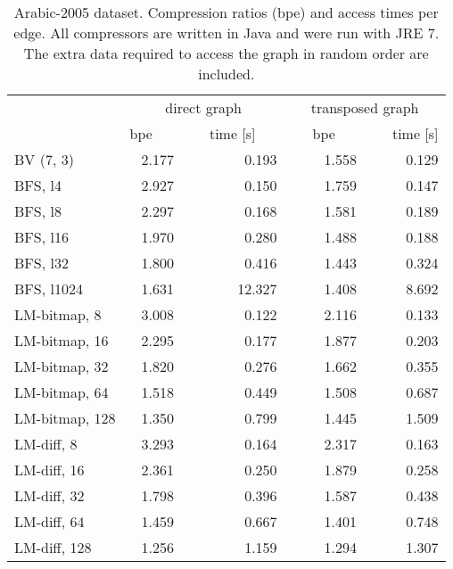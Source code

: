 \documentclass[envcountsame]{llncs}
\begin{document}
\begin{table}
\centering
\begin{tabular}{lrrrr}
\hline
        & \multicolumn{2}{c}{direct graph} & \multicolumn{2}{c}{transposed graph} \\
\cline{2-5}
        &  bpe~~~&~~~time [s]~~~&~~~bpe~~~&~~~time [s] \\
BV (7, 3) & 2.177 & 0.193 & 1.558 & 0.129 \\
BFS, l4 & 2.927 & 0.150 & 1.759 & 0.147 \\
BFS, l8 & 2.297 & 0.168 & 1.581 & 0.189 \\
BFS, l16 & 1.970 & 0.280 & 1.488 & 0.188 \\
BFS, l32 & 1.800 & 0.416 & 1.443 & 0.324 \\
BFS, l1024 & 1.631 & 12.327 & 1.408 & 8.692 \\
LM-bitmap, 8 & 3.008 & 0.122 & 2.116 & 0.133 \\ 
LM-bitmap, 16 & 2.295 & 0.177 & 1.877 & 0.203 \\
LM-bitmap, 32 & 1.820 & 0.276 & 1.662 & 0.355 \\ 
LM-bitmap, 64 & 1.518 & 0.449 & 1.508 & 0.687 \\
LM-bitmap, 128 & 1.350 & 0.799 & 1.445 & 1.509 \\ 
LM-diff, 8 & 3.293 & 0.164 & 2.317 & 0.163 \\
LM-diff, 16 & 2.361 & 0.250 & 1.879 & 0.258 \\
LM-diff, 32 & 1.798 & 0.396 & 1.587 & 0.438 \\ 
LM-diff, 64 & 1.459 & 0.667 & 1.401 & 0.748 \\ 
LM-diff, 128 & 1.256 & 1.159 & 1.294 & 1.307 \\
\hline
\end{tabular}
\vspace{4mm}
\caption{Arabic-2005 dataset. Compression ratios (bpe) and access times per edge. 
All compressors are written in Java and were run with JRE 7.
The extra data required to access the graph in random order are included.
}
\label{table:app_arabic}
\end{table}
\end{document}
